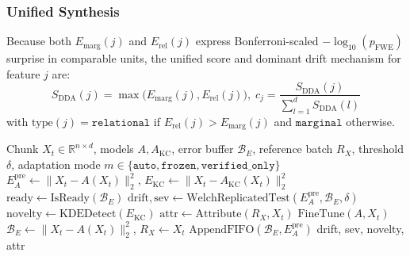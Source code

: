 \documentclass[10pt,conference]{IEEEtran}
\begin{document}
\subsubsection{Unified Synthesis}
Because both $E_{\mathrm{marg}}(j)$ and $E_{\mathrm{rel}}(j)$ express
Bonferroni-scaled $-\log_{10}(p_{\mathrm{FWE}})$ surprise in comparable units,
the unified score and dominant drift mechanism for feature $j$ are:
\begin{equation}
  S_{\mathrm{DDA}}(j) = \max\bigl(E_{\mathrm{marg}}(j), E_{\mathrm{rel}}(j)\bigr),
  \;
  c_j = \frac{S_{\mathrm{DDA}}(j)}{\sum_{l=1}^d S_{\mathrm{DDA}}(l)}
  \label{eq:dda_combined}
\end{equation}
with $\mathrm{type}(j) = \texttt{relational}$ if
$E_{\mathrm{rel}}(j) > E_{\mathrm{marg}}(j)$ and $\texttt{marginal}$ otherwise.

\begin{algorithm}[!t]
\caption{Vigil Streaming Detection \& Drift Attribution}
\label{alg:vigil}
\small
\begin{algorithmic}[1]
\REQUIRE Chunk $X_t \in \mathbb{R}^{n \times d}$, models $A, A_{\mathrm{KC}}$,
         error buffer $\mathcal{B}_E$, reference batch $R_X$, threshold $\delta$,
         adaptation mode $m \in \{\texttt{auto}, \texttt{frozen}, \texttt{verified\_only}\}$
\STATE $E_A^{\mathrm{pre}} \leftarrow \|X_t - A(X_t)\|^2_2$, \quad
       $E_{\mathrm{KC}} \leftarrow \|X_t - A_{\mathrm{KC}}(X_t)\|^2_2$
\STATE $\mathrm{ready} \leftarrow \mathrm{IsReady}(\mathcal{B}_E)$
\STATE $\mathrm{drift}, \mathrm{sev} \leftarrow \mathrm{WelchReplicatedTest}(E_A^{\mathrm{pre}}, \mathcal{B}_E, \delta)$
\STATE $\mathrm{novelty} \leftarrow \mathrm{KDEDetect}(E_{\mathrm{KC}})$ 
  \STATE $\mathrm{attr} \leftarrow \mathrm{Attribute}(R_X, X_t)$ 
    \STATE $\mathrm{FineTune}(A, X_t)$
    \STATE $\mathcal{B}_E \leftarrow \|X_t - A(X_t)\|^2_2$, \quad $R_X \leftarrow X_t$
  \ENDIF
{}
  \STATE $\mathrm{AppendFIFO}(\mathcal{B}_E, E_A^{\mathrm{pre}})$
\ENDIF
\RETURN drift, sev, novelty, attr
\end{algorithmic}
\end{algorithm}



\end{document}
